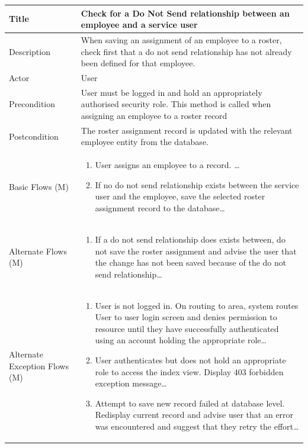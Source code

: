 \documentclass[a4paper,12pt]{article}
\newcommand\addrow[2]{#1 &#2\\ }
\newcommand\addheading[2]{#1 &#2\\ \hline}
\newcommand\tabularhead{\begin{tabular}{lp{8cm}}
\hline
}
\newcommand\addmulrow[2]{ \begin{minipage}[t][][t]{2.5cm}#1\end{minipage}%
   &\begin{minipage}[t][][t]{8cm}
    \begin{enumerate} #2   \end{enumerate}
    \end{minipage}\\ }
\newenvironment{usecase}{\tabularhead}
{\hline\end{tabular}}
\begin{document}
\begin{samepage}
\begin{usecase}
    \addheading{Title}{Check for a Do Not Send relationship between an employee and a service user}
  \addheading{Description}{When saving an assignment of an employee to a roster, check first that a do not send relationship has not already been defined for that employee.}
  \addheading{Actor}{User} 
  \addrow{Precondition}{User must be logged in and hold an appropriately authorised security role. This method is called when assigning an employee to a roster record}
  \addrow{Postcondition}{The roster assignment record is updated with the relevant employee entity from the database.}
  \addmulrow{Basic Flows (M)}{\item User assigns an employee to a record. \ldots
  \item If no do not send relationship exists between the service user and the employee, save the selected roster assignment record to the database\ldots}
  \addmulrow{Alternate  Flows (M)}{\item If a do not send relationship does exists between, do not save the roster assignment and advise the user that the change has not been saved because of the do not send relationship\ldots}
  \addmulrow{Alternate Exception Flows (M)}{\item User is not logged in. On routing to area, system routes User to user login screen and denies permission to resource until they have successfully authenticated using an account holding the appropriate role\ldots
                                                                      \item User authenticates but does not hold an appropriate role to access the index view. Display 403 forbidden exception message\ldots
                                                                      \item Attempt to save new record failed at database level. Redisplay current record and advise user that an error was encountered and suggest that they retry the effort\ldots}

\end{usecase}


\end{samepage}
\end{document}
